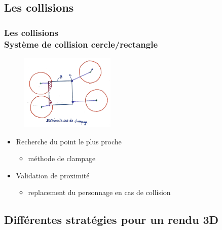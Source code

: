 \documentclass{beamer}
\begin{document}
\subsection{Les collisions}

\begin{frame}
    \frametitle{Les collisions \\
                \small Système de collision cercle/rectangle}
    \begin{figure}
        \centering
        \includegraphics[width=0.4\textwidth]{images/fig4.jpg}
    \end{figure}
    \begin{block}{}
        \begin{itemize}
            \item Recherche du point le plus proche
            \begin{itemize}
                \item méthode de clampage
            \end{itemize}
            \item Validation de proximité
            \begin{itemize}
                \item replacement du personnage en cas de collision
            \end{itemize}
        \end{itemize}
    \end{block}
\end{frame}

\subsection{Différentes stratégies pour un rendu 3D}
\end{document}
